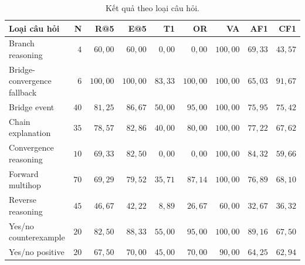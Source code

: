 \begin{table}[t]
    \centering
    \scriptsize
    \caption{Kết quả theo loại câu hỏi.}
    \label{tab:question-type-results}
    \begin{tabular}{lrrrrrrrr}
        \hline
        \textbf{Loại câu hỏi} &
        \textbf{N} &
        \textbf{R@5} &
        \textbf{E@5} &
        \textbf{T1} &
        \textbf{OR} &
        \textbf{VA} &
        \textbf{AF1} &
        \textbf{CF1} \\
        \hline
        Branch reasoning &
        \(4\) &
        \(60{,}00\) &
        \(60{,}00\) &
        \(0{,}00\) &
        \(0{,}00\) &
        \(100{,}00\) &
        \(69{,}33\) &
        \(43{,}57\) \\

        Bridge-convergence fallback &
        \(6\) &
        \(100{,}00\) &
        \(100{,}00\) &
        \(83{,}33\) &
        \(100{,}00\) &
        \(100{,}00\) &
        \(65{,}03\) &
        \(91{,}67\) \\

        Bridge event &
        \(40\) &
        \(81{,}25\) &
        \(86{,}67\) &
        \(50{,}00\) &
        \(95{,}00\) &
        \(100{,}00\) &
        \(75{,}95\) &
        \(75{,}42\) \\

        Chain explanation &
        \(35\) &
        \(78{,}57\) &
        \(82{,}86\) &
        \(40{,}00\) &
        \(80{,}00\) &
        \(100{,}00\) &
        \(77{,}22\) &
        \(67{,}62\) \\

        Convergence reasoning &
        \(10\) &
        \(69{,}33\) &
        \(82{,}50\) &
        \(0{,}00\) &
        \(0{,}00\) &
        \(100{,}00\) &
        \(84{,}32\) &
        \(59{,}66\) \\

        Forward multihop &
        \(70\) &
        \(69{,}29\) &
        \(79{,}52\) &
        \(35{,}71\) &
        \(87{,}14\) &
        \(100{,}00\) &
        \(76{,}89\) &
        \(68{,}10\) \\

        Reverse reasoning &
        \(45\) &
        \(46{,}67\) &
        \(42{,}22\) &
        \(8{,}89\) &
        \(26{,}67\) &
        \(60{,}00\) &
        \(32{,}67\) &
        \(36{,}32\) \\

        Yes/no counterexample &
        \(20\) &
        \(82{,}50\) &
        \(88{,}33\) &
        \(55{,}00\) &
        \(95{,}00\) &
        \(100{,}00\) &
        \(89{,}16\) &
        \(67{,}50\) \\

        Yes/no positive &
        \(20\) &
        \(67{,}50\) &
        \(70{,}00\) &
        \(45{,}00\) &
        \(70{,}00\) &
        \(90{,}00\) &
        \(64{,}25\) &
        \(62{,}94\) \\
        \hline
    \end{tabular}
\end{table}

